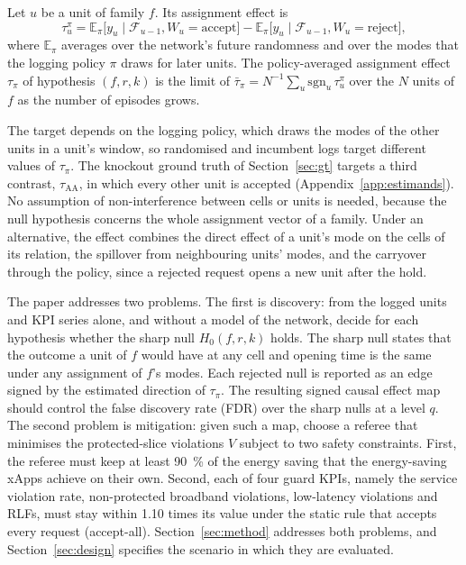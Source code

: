 \begin{definition}
\label{def:tau_pi}
Let $u$ be a unit of family $f$. Its assignment effect is
\begin{equation}
\tau_u^{\pi} = \mathbb{E}_{\pi}\bigl[y_u \mid \mathcal{F}_{u-1}, W_u = \text{accept}\bigr]
             - \mathbb{E}_{\pi}\bigl[y_u \mid \mathcal{F}_{u-1}, W_u = \text{reject}\bigr],
\label{eq:tau_u}
\end{equation}
where $\mathbb{E}_{\pi}$ averages over the network's future randomness and over the modes that the logging policy
$\pi$ draws for later units. The policy-averaged assignment effect $\tau_{\pi}$ of hypothesis $(f, r, k)$ is the
limit of $\bar\tau_{\pi} = N^{-1} \sum_u \mathrm{sgn}_u\, \tau_u^{\pi}$ over the $N$ units of $f$ as the number of
episodes grows.
\end{definition}

The target depends on the logging policy, which draws the modes of the other units in a unit's window, so randomised and
incumbent logs target different values of $\tau_{\pi}$. The knockout ground truth of Section~\ref{sec:gt} targets a third contrast, $\tau_{\mathrm{AA}}$, in which every other unit is accepted
(Appendix~\ref{app:estimands}). No assumption of non-interference between cells or units is needed, because the null
hypothesis concerns the whole assignment vector of a family. Under an alternative, the effect combines the direct
effect of a unit's mode on the cells of its relation, the spillover from neighbouring units' modes, and the carryover
through the policy, since a rejected request opens a new unit after the hold.

The paper addresses two problems. The first is discovery: from the logged units and KPI series alone, and without a
model of the network, decide for each hypothesis whether the sharp null $H_0(f, r, k)$ holds. The sharp null states that the
outcome a unit of $f$ would have at any cell and opening time is the same under any assignment of $f$'s modes. Each
rejected null is reported as an edge signed by the estimated direction of $\tau_{\pi}$. The resulting signed causal effect map should control the false discovery
rate (FDR) over the sharp nulls at a level $q$. The second problem is mitigation: given such a map, choose a referee
that minimises the protected-slice violations $V$ subject to two safety constraints. First, the referee must keep at least 90~\% of
the energy saving that the energy-saving xApps achieve on their own. Second, each of four guard KPIs, namely the service
violation rate, non-protected broadband violations, low-latency violations and RLFs, must stay within 1.10 times its
value under the static rule that accepts every request (accept-all).
Section~\ref{sec:method} addresses both problems, and Section~\ref{sec:design} specifies the scenario in which they are
evaluated.

